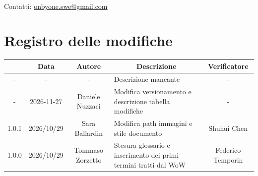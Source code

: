 \documentclass[11pt, a4paper]{article}
\begin{document}
\begin{titlepage}
    \vspace{0.5cm}
    
    {\large Contatti: \href{mailto:onbyone.swe@gmail.com}{onbyone.swe@gmail.com} }
    
\end{titlepage}


\newpage

\section*{Registro delle modifiche}
\vspace{1cm}
\begin{center}
    \renewcommand{\arraystretch}{1.5}
    \begin{tabularx}{\textwidth}{|c|c|c|X|c|}
        \hline
        \rowcolor{gray!10} 
        \multicolumn{1}{|c|}{\textbf{Versione}} & 
        \multicolumn{1}{c|}{\textbf{Data}} & 
        \multicolumn{1}{c|}{\textbf{Autore}} & 
        \multicolumn{1}{c|}{\textbf{Descrizione}} & 
        \multicolumn{1}{c|}{\textbf{Verificatore}} \\
        \hline
        - & - & - & Descrizione mancante & - \\
        \hline
        - & 2026-11-27 & Daniele Nuzzaci & Modifica versionamento e descrizione tabella modifiche & - \\ %
        \hline
        1.0.1 & 2026/10/29 & Sara Ballardin & Modifica path immagini e stile documento & Shuhui Chen \\
        \hline
        1.0.0 & 2026/10/29 & Tommaso Zorzetto & Stesura glossario e inserimento dei primi termini tratti dal WoW & Federico Temporin \\
        \hline
        
    \end{tabularx}
\end{center}


\newpage

\tableofcontents
\newpage

\end{document}
